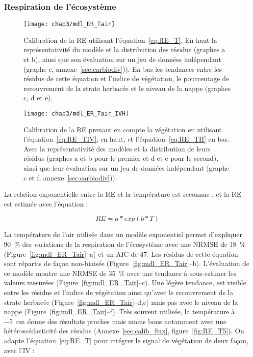 \subsubsection{Respiration de l'écosystème}

\begin{figure} %
\centering
\texttt{[image: chap3/mdl\_ER\_Tair]}
\caption{\label{fig:mdl_ER_Tair}
Calibration de la RE utilisant l'équation~\ref{eq:RE_T}. En haut la représentativité du modèle et la distribution des résidus (graphes a et b), ainsi que son évaluation sur un jeu de données indépendant (graphe c, annexe~\ref{sec:carbiodiv})). En bas les tendances entre les résidus de cette équation et l'indice de végétation, le pourcentage de recouvrement de la strate herbacée et le niveau de la nappe (graphes c, d et e).}
\texttt{[image: chap3/mdl\_ER\_Tair\_IVH]}
\caption{\label{fig:ER_mdl_TairIVH}Calibration de la RE prenant en compte la végétation en utilisant l'équation~\ref{eq:RE_TIV}, en haut, et l'équation~\ref{eq:RE_TH} en bas. Avec la représentativité des modèles et la distribution de leurs résidus (graphes a et b pour le premier et d et e pour le second), ainsi que leur évaluation sur un jeu de données indépendant (graphe c et f, annexe~\ref{sec:carbiodiv})).}
\end{figure}

La relation exponentielle entre la RE et la température est reconnue \citep{luo2006}, et la RE est estimée avec l'équation :

\begin{equation} \label{eq:RE_T}
RE = a*exp(b*T)
\end{equation}

La température de l'air utilisée dans un modèle exponentiel permet d'expliquer \SI{90}{\percent} des variations de la respiration de l'écosystème avec une NRMSE de \SI{18}{\percent} (Figure~\ref{fig:mdl_ER_Tair}--a) et un AIC de 47.
Les résidus de cette équation sont répartis de façon non-biaisée (Figure~\ref{fig:mdl_ER_Tair}--b).
L'évaluation de ce modèle montre une NRMSE de \SI{35}{\percent} avec une tendance à sous-estimer les valeurs mesurées (Figure~\ref{fig:mdl_ER_Tair}--c).
Une légère tendance, est visible entre les résidus et l'indice de végétation ainsi qu'avec le recouvrement de la strate herbacée (Figure~\ref{fig:mdl_ER_Tair}--d,e) mais pas avec le niveau de la nappe (Figure~\ref{fig:mdl_ER_Tair}--f).
Très souvent utilisée, la température à \SI{-5}{\centi\metre} donne des résultats proches mais moins bons notamment avec une hétéroscédasticité des résidus (Annexe~\ref{sec:calib_flux}, figure~\ref{fig:RE_T5}).
On adapte l'équation~\ref{eq:RE_T} pour intégrer le signal de végétation de deux façon, avec l'IV :


